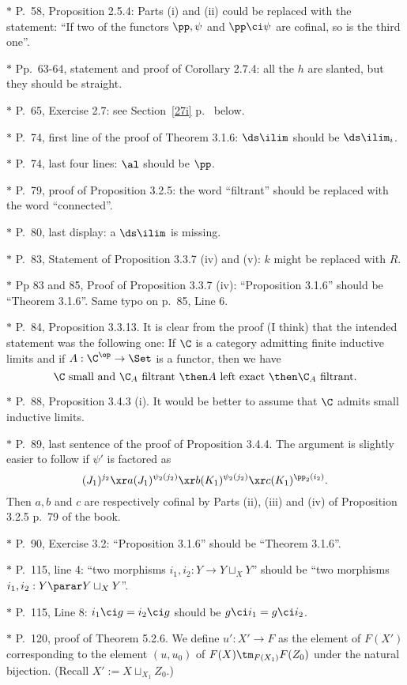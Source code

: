 \documentclass[12pt]{article}
\theoremstyle{remark}
\theoremstyle{definition}
\begin{document}
\nn$*$ P.~58, Proposition 2.5.4: Parts (i) and (ii) could be replaced with the statement: ``If two of the functors $\pp,\psi$ and $\pp\ci\psi$ are cofinal, so is the third one''.

\nn$*$ Pp.~63-64, statement and proof of Corollary 2.7.4: all the $h$ are slanted, but they should be straight.

\nn$*$ P.~65, Exercise 2.7: see Section~\ref{27i} p.~ below.

\nn$*$ P.~74, first line of the proof of Theorem 3.1.6: $\ds\ilim$ should be $\ds\ilim_i$. 

\nn$*$ P.~74, last four lines: $\al$ should be $\pp$.

\nn$*$ P.~79, proof of Proposition 3.2.5: the word ``filtrant'' should be replaced with the word ``connected''.

\nn$*$ P.~80, last display: a $\ds\ilim$ is missing.

\nn$*$ P.~83, Statement of Proposition 3.3.7 (iv) and (v): $k$ might be replaced with $R$. 

\nn$*$ Pp 83 and 85, Proof of Proposition 3.3.7 (iv): ``Proposition 3.1.6'' should be ``Theorem 3.1.6''. Same typo on p.~85, Line 6.

\nn$*$ P.~84, Proposition 3.3.13. It is clear from the proof (I think) that the intended statement was the following one: If $\C$ is a category admitting finite inductive limits and if $A:\C^{\op}\to\Set$ is a functor, then we have 
$$
\C\text{ small and }\C_A\text{ filtrant }\then A\text{ left exact }\then\C_A\text{ filtrant}.
$$

\nn$*$ P.~88, Proposition 3.4.3 (i). It would be better to assume that $\C$ admits small inductive limits.

\nn$*$ P.~89, last sentence of the proof of Proposition 3.4.4. The argument is slightly easier to follow if $\psi'$ is factored as 
$$
(J_1)^{j_2}\xr a(J_1)^{\psi_2(j_2)}\xr b(K_1)^{\psi_2(j_2)}\xr c(K_1)^{\pp_2(i_2)}.
$$ 
Then $a,b$ and $c$ are respectively cofinal by Parts (ii), (iii) and (iv) of Proposition 3.2.5 p.~79 of the book.

\nn$*$ P.~90, Exercise 3.2: ``Proposition 3.1.6'' should be ``Theorem 3.1.6''.

\nn$*$ P.~115, line 4: ``two morphisms $i_1,i_2:Y\to Y\sqcup_XY$'' should be ``two morphisms $i_1,i_2:Y\parar Y\sqcup_XY$''. 

\nn$*$ P.~115, Line 8: $i_1\ci g=i_2\ci g$ should be $g\ci i_1=g\ci i_2$.

\nn$*$ P.~120, proof of Theorem 5.2.6. We define $u':X'\to F$ as the element of $F(X')$ corresponding to the element $(u,u_0)$ of $F(X)\tm_{F(X_1)}F(Z_0)$ under the natural bijection. (Recall $X':=X\sqcup_{X_1}Z_0$.)
\end{document}
